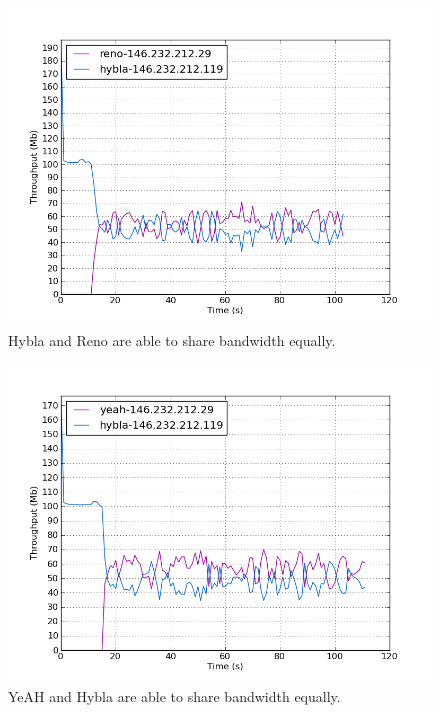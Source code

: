 \documentclass[11pt,a4paper,twocolumn]{article}
\begin{document}
\begin{figure}[p]
	\includegraphics[width=\linewidth]{exp16.png}
	\caption{Hybla and Reno are able to share bandwidth equally.}
	\label{fig:hybla_reno}
\end{figure}

\begin{figure}[p]
	\includegraphics[width=\linewidth]{exp19.png}
	\caption{YeAH and Hybla are able to share bandwidth equally.}
	\label{fig:hybla_yeah}
\end{figure}
\end{document}
